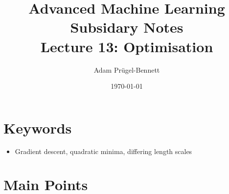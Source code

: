 \documentclass[11pt]{article}
\author{Adam Prügel-Bennett}
\date{\today}
\title{Advanced Machine Learning Subsidary Notes\\\medskip
\large Lecture 13: Optimisation}
\begin{document}
\maketitle

\section{Keywords}
\label{sec:org2c4e83f}
\begin{itemize}
\item Gradient descent, quadratic minima, differing length scales
\end{itemize}

\section{Main Points}
\label{sec:org3972a2a}
\end{document}
